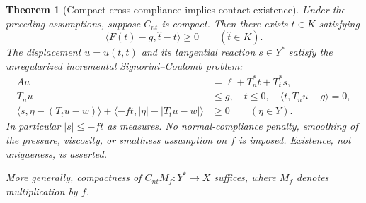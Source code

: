\documentclass[11pt,a4paper]{article}
\newtheorem{theorem}{Theorem}[section]
\theoremstyle{definition}\newtheorem{definition}[theorem]{Definition}
\theoremstyle{remark}\newtheorem{remark}[theorem]{Remark}
\newcommand{\ip}[2]{\langle #1,#2\rangle}
\numberwithin{equation}{section}
\begin{document}
\begin{theorem}[Compact cross compliance implies contact existence]\label{thm:compactcontact}
Under the preceding assumptions, suppose $C_{nt}$ is compact. Then there exists $t\in K$ satisfying
\begin{equation}\label{eq:normalVI}
 \ip{F(t)-g}{\widehat t-t}\ge0\qquad(\widehat t\in K).
\end{equation}
The displacement $u=u(t,t)$ and its tangential reaction $s\in Y^*$ satisfy the unregularized incremental Signorini--Coulomb problem:
\begin{align}
 Au&=\ell+T_n^*t+T_t^*s,\label{eq:actualequilibrium}\\
 T_nu&\le g,\quad t\le0,\quad\ip{t}{T_nu-g}=0,\label{eq:actualnormal}\\
 \ip{s}{\eta-(T_tu-w)}+\ip{-ft}{|\eta|-|T_tu-w|}&\ge0
       \qquad(\eta\in Y).\label{eq:actualfriction}
\end{align}
In particular $|s|\le-ft$ as measures. No normal-compliance penalty, smoothing of the pressure, viscosity, or smallness assumption on $f$ is imposed. Existence, not uniqueness, is asserted.

More generally, compactness of $C_{nt}M_f:Y^*\to X$ suffices, where $M_f$ denotes multiplication by $f$.
\end{theorem}
\end{document}
